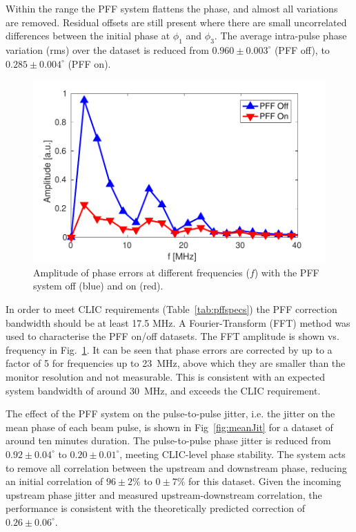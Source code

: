 \documentclass[%
 reprint,
 superscriptaddress,
 amsmath,
 amssymb,
 prl,
]{revtex4-1}
\begin{document}
Within the range the PFF system flattens the phase, and almost all variations 
are removed. 
Residual offsets are still present where there are small uncorrelated 
differences between the initial phase at \(\phi_1\) and \(\phi_3\). 
The average intra-pulse phase variation (rms) over the dataset is reduced from 
\(0.960\pm0.003^\circ\) (PFF off), to \(0.285\pm0.004^\circ\) (PFF on).

\begin{figure}
	\includegraphics[width=\columnwidth]{fig7}
	\caption{\label{fig:fft}Amplitude of phase errors at different frequencies 
		(\(f\)) with the PFF system off (blue) and on (red).}
\end{figure}

In order to meet CLIC requirements (Table~\ref{tab:pffspecs}) the PFF 
correction bandwidth should be at least 17.5 MHz. 
A Fourier-Transform (FFT) method was used to characterise the PFF on/off 
datasets. The FFT amplitude is shown vs. frequency in 
Fig.~\ref{fig:fft}. It can be seen that phase errors are corrected by up to a 
factor of 5 for frequencies up to 23~MHz, above which 
they are smaller than the monitor resolution and not measurable. This 
is consistent with an expected system bandwidth of around 30~MHz, and exceeds 
the CLIC requirement.

The effect of the PFF system on the pulse-to-pulse jitter, i.e. the jitter on 
the mean phase of each beam pulse, is shown in Fig~\ref{fig:meanJit} for a 
dataset of around ten minutes duration.
The pulse-to-pulse phase jitter is reduced from  \(0.92\pm0.04^\circ\) to 
\(0.20\pm0.01^\circ\), meeting CLIC-level phase stability. 
The system acts to remove all correlation between the upstream and 
downstream phase, reducing an initial correlation of \(96\pm2\%\) to 
\(0\pm7\%\) for this dataset.
Given the incoming upstream phase jitter and 
measured upstream-downstream correlation, the performance is consistent with 
the theoretically predicted correction of \(0.26\pm0.06^\circ\).
\end{document}
